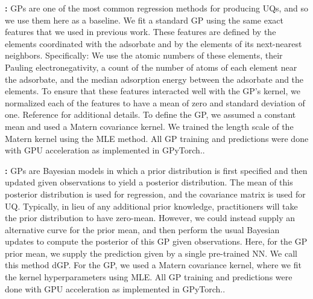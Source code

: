 \documentclass[]{achemso}
\begin{document}
\textbf{:}
\gls{GP}s are one of the most common regression methods for producing \gls{UQ}s, and so we use them here as a baseline.
We fit a standard \gls{GP} using the same exact features that we used in previous work.\cite{Tran2018}
These features are defined by the elements coordinated with the adsorbate and by the elements of its next-nearest neighbors.
Specifically:  We use the atomic numbers of these elements, their Pauling electronegativity, a count of the number of atoms of each element near the adsorbate, and the median adsorption energy between the adsorbate and the elements.
To ensure that these features interacted well with the \gls{GP}'s kernel, we normalized each of the features to have a mean of zero and standard deviation of one.
Reference \citet{Tran2018} for additional details.
To define the \gls{GP}, we assumed a constant mean and used a Matern covariance kernel.
We trained the length scale of the Matern kernel using the \gls{MLE} method.
All \gls{GP} training and predictions were done with GPU acceleration as implemented in GPyTorch.\cite{Gardner2018}.

\textbf{:}
\gls{GP}s are Bayesian models in which a prior distribution is first specified and then updated given observations to yield a posterior distribution. 
The mean of this posterior distribution is used for regression, and the covariance matrix is used for \gls{UQ}. 
Typically, in lieu of any additional prior knowledge, practitioners will take the prior distribution to have zero-mean. 
However, we could instead supply an alternative curve for the prior mean, and then perform the usual Bayesian updates to compute the posterior of this \gls{GP} given observations. 
Here, for the \gls{GP} prior mean, we supply the prediction given by a single pre-trained \gls{NN}. 
We call this method \gls{dGP}.
For the \gls{GP}, we used a Matern covariance kernel, where we fit the kernel hyperparameters using \gls{MLE}. 
All \gls{GP} training and predictions were done with GPU acceleration as implemented in GPyTorch.\cite{Gardner2018}.
\end{document}
